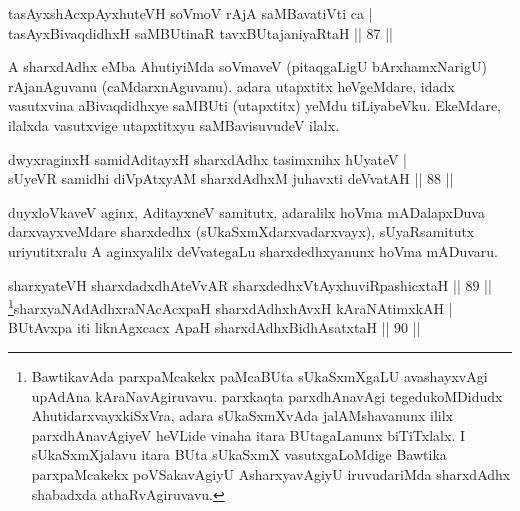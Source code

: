 
\begin{shl}
tasAyxshAcxpAyxhuteVH soVmoV rAjA saMBavatiVti ca | \\
tasAyxBivaqdidhxH saMBUtinaR tavxBUtajaniyaRtaH \hfill|| 87 || 
\end{shl}

\begin{artha}
A sharxdAdhx eMba AhutiyiMda soVmaveV (pitaqgaLigU bArxhamxNarigU) rAjanAguvanu (caMdarxnAguvanu). adara utapxtitx heVgeMdare, idadx vasutxvina aBivaqdidhxye saMBUti (utapxtitx) yeMdu tiLiyabeVku. EkeMdare, ilalxda vasutxvige utapxtitxyu saMBavisuvudeV ilalx.
\end{artha}


\begin{shl}
dwyxraginxH samidAditayxH sharxdAdhx tasimxnihx hUyateV | \\
sUyeVR samidhi diVpAtxyAM sharxdAdhxM juhavxti deVvatAH \hfill|| 88 || 
\end{shl}

\begin{artha}
duyxloVkaveV aginx, AditayxneV samitutx, adaralilx hoVma mADalapxDuva 
darxvayxveMdare sharxdedhx (sUkaSxmXdarxvadarxvayx), sUyaRsamitutx 
uriyutitxralu A aginxyalilx deVvategaLu sharxdedhxyanunx hoVma mADuvaru.
\end{artha}



\begin{shl}
sharxyateVH sharxdadxdhAteVvAR sharxdedhxVtAyxhuviRpashicxtaH \hfill|| 89 || \\
\footnote{BawtikavAda parxpaMcakekx paMcaBUta sUkaSxmXgaLU avashayxvAgi upAdAna kAraNavAgiruvavu. parxkaqta parxdhAnavAgi tegedukoMDidudx AhutidarxvayxkiSxVra, adara sUkaSxmXvAda jalAMshavanunx ililx parxdhAnavAgiyeV heVLide vinaha itara BUtagaLanunx biTiTxlalx. I sUkaSxmXjalavu itara BUta sUkaSxmX vasutxgaLoMdige Bawtika parxpaMcakekx poVSakavAgiyU AsharxyavAgiyU iruvudariMda sharxdAdhx shabadxda athaRvAgiruvavu.}sharxyaNAdAdhxraNAcAcx\s \s paH sharxdAdhxhAvxH kAraNAtimxkAH | \\
BUtAvx\s \s pa iti liknAgxcacx ApaH sharxdAdhxBidhAsatxtaH \hfill|| 90 || 
\end{shl}


